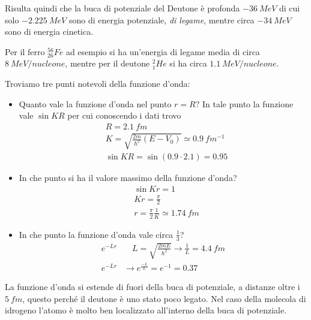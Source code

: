 Risulta quindi che la buca di potenziale del Deutone è profonda $\SI{-36}{MeV}$ di cui solo $\SI{-2.225}{MeV}$ sono di energia potenziale, \emph{di legame}, mentre circa $\SI{-34}{MeV}$ sono di energia cinetica.

Per il ferro $^{56}_{26}Fe$ ad esempio si ha un'energia di legame media di circa $\SI{8}{MeV / nucleone}$, mentre
per il deutone $^{2}_{1}He$ si ha circa $\SI{1.1}{MeV / nucleone}$.

Troviamo tre punti notevoli della funzione d'onda:

\begin{itemize}
\item Quanto vale la funzione d'onda nel punto $r=R$?
In tale punto la funzione vale $\sin K R$ per cui conoscendo i dati trovo
\begin{equation}
\begin{split}
& R = \SI{2.1}{fm} \\
& K = \sqrt{ \frac{2m}{\hbar^2} (E - V_0) } \simeq \SI{0.9}{fm^{-1}} \\
& \sin K R = \sin (0.9 \cdot 2.1) = 0.95
\end{split}
\end{equation}

\item In che punto si ha il valore massimo della funzione d'onda?
\begin{equation}
\begin{split}
& \sin K r = 1 \\
& K r = \frac{\pi}{2} \\
& r = \frac{\pi}{2} \frac{1}{K} \simeq \SI{1.74}{fm}
\end{split}
\end{equation}

\item In che punto la funzione d'onda vale circa $\frac{1}{3}$?
\begin{equation}
\begin{split}
e^{ - L r } & \quad L = \sqrt{\frac{2mE}{\hbar^2}} \to \frac{1}{L} = \SI{4.4}{fm} \\
e^{ - L r } & \rightarrow e^{ \frac{-L}{L}} = e^{ -1 } = 0.37
\end{split}
\end{equation}
\end{itemize}
La funzione d'onda si estende di fuori della buca di potenziale, a distanze oltre i $\SI{5}{fm}$, questo perché il deutone è uno stato poco legato.
Nel caso della molecola di idrogeno l'atomo è molto ben localizzato all'interno della buca di potenziale.

